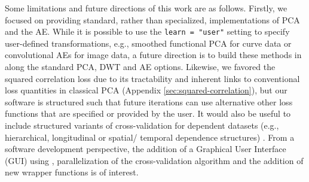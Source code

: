 Some limitations and future directions of this work are as follows.
Firstly, we focused on providing standard, rather than specialized, implementations of PCA and the AE.
While it is possible to use the \texttt{learn = "user"} setting to specify user-defined transformations, e.g., smoothed functional PCA for curve data or convolutional AEs for image data, a future direction is to build these methods in along the standard PCA, DWT and AE options.
Likewise, we favored the squared correlation loss due to its tractability and inherent links to conventional loss quantities in classical PCA (Appendix \ref{sec:squared-correlation}), but our software is structured such that future iterations can use alternative other loss functions \parencite[e.g., concordance index, see][]{yang_quantile_2020} that are specified or provided by the user.
It would also be useful to include structured variants of cross-validation for dependent datasets (e.g., hierarchical, longitudinal or spatial/ temporal dependence structures) \parencite{bergmeir_note_2018, hornung_evaluating_2023, roberts_cross-validation_2017}.
From a software development perspective, the addition of a Graphical User Interface (GUI) using  \parencite{chang_shiny_2021}, parallelization of the cross-validation algorithm and the addition of new wrapper functions is of interest.
